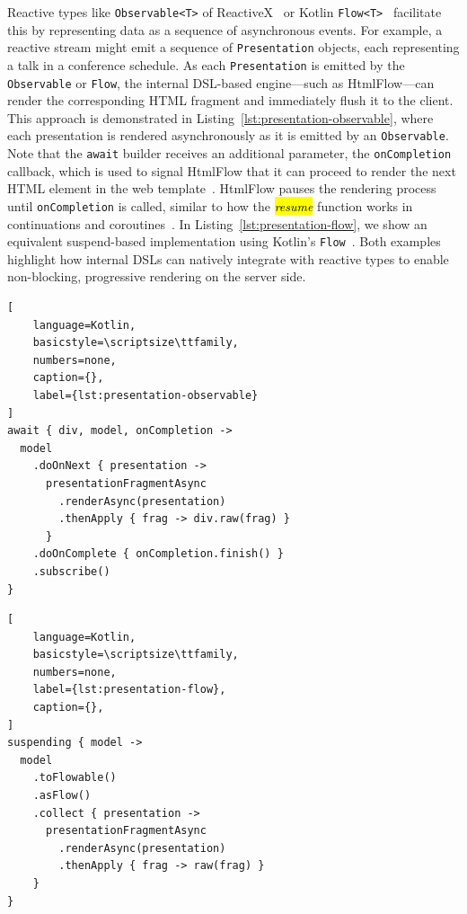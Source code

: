 \documentclass[software,article,accept,pdftex,moreauthors]{Definitions/mdpi}
\begin{document}
Reactive types like \texttt{Observable<T>} of ReactiveX~\cite{rxjava} or Kotlin \texttt{Flow<T>}~\cite{kotlinlang}
facilitate this by representing data as a sequence of asynchronous events.
For example, a reactive stream might emit a sequence of \texttt{Presentation}
objects, each representing a talk in a conference schedule.
As each \texttt{Presentation} is emitted by the \texttt{Observable}
or \texttt{Flow}, the internal DSL-based engine---such as HtmlFlow---can render the
corresponding HTML fragment and immediately flush it to the client. This
approach is demonstrated in Listing~\ref{lst:presentation-observable}, where each
presentation is rendered asynchronously as it is emitted by an
\texttt{Observable}.
Note that the \texttt{await} builder receives an additional parameter, the
\texttt{onCompletion} callback, which is used to signal HtmlFlow that it can
proceed to render the next HTML element in the web
template~\cite{carvalho2023async}.
HtmlFlow pauses the rendering process until \texttt{onCompletion} is called,
similar to how the \emph{\hl{resume}} function works in continuations and
coroutines~\cite{coroutines_continuations}.
In Listing~\ref{lst:presentation-flow}, we show an
equivalent suspend-based implementation using Kotlin's \texttt{Flow}~\cite{wise2024pssr}.
Both examples highlight how internal DSLs can natively integrate with reactive types
to enable non-blocking, progressive rendering on the server side.

\begin{listing}[H]
\caption{\textit{\hl{HtmlFlow reactive}} presentation template in Kotlin with an \texttt{Observable} model.}
\begin{lstlisting}[
    language=Kotlin,
    basicstyle=\scriptsize\ttfamily,
    numbers=none,
    caption={},
    label={lst:presentation-observable}
]
await { div, model, onCompletion ->
  model
    .doOnNext { presentation ->
      presentationFragmentAsync
        .renderAsync(presentation)
        .thenApply { frag -> div.raw(frag) }
      }
    .doOnComplete { onCompletion.finish() }
    .subscribe()
}
\end{lstlisting}
\end{listing}

\vspace{-12pt}
\begin{listing}[H]
\caption{\textit{\hl{HtmlFlow suspend}} presentation template in Kotlin with a \texttt{Flow} model.}
\begin{lstlisting}[
    language=Kotlin,
    basicstyle=\scriptsize\ttfamily,
    numbers=none,
    label={lst:presentation-flow},
    caption={},
]
suspending { model ->
  model
    .toFlowable()
    .asFlow()
    .collect { presentation ->
      presentationFragmentAsync
        .renderAsync(presentation)
        .thenApply { frag -> raw(frag) }
    }
}
\end{lstlisting}
\end{listing}
\end{document}
